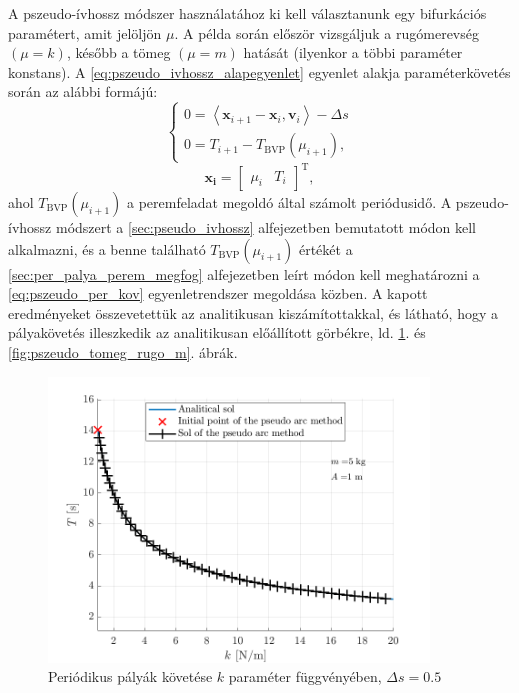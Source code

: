 A pszeudo-ívhossz módszer használatához ki kell választanunk egy bi\-fur\-ká\-ci\-ós paramétert, amit jelöljön $\mu$.
A példa során először vizsgáljuk a rugómerevség $(\mu = k)$, később a tömeg $(\mu =m)$ hatását (ilyenkor a többi paraméter konstans).
A \eqref{eq:pszeudo_ivhossz_alapegyenlet} egyenlet alakja paraméterkövetés során az alábbi formájú:
\begin{equation}
\begin{cases}
0 = \left< \mathbf{x}_{i+1} - \mathbf{x}_i, \mathbf{v}_i \right> - \Delta s \\
0 = T_{i+1} - T_{\mathrm{BVP}}(\mu_{i+1}),
\end{cases}
\label{eq:pszeudo_per_kov}
\end{equation}
\begin{equation}
\mathbf{x_i}= \begin{bmatrix}
\mu_{i} & T_{i}
\end{bmatrix}^\mathrm{T},
\end{equation}
ahol $T_{\mathrm{BVP}}(\mu_{i+1})$ a peremfeladat megoldó által számolt periódusidő.
A psze\-u\-do-ív\-hossz módszert a \ref{sec:pseudo_ivhossz} alfejezetben bemutatott módon kell alkalmazni, és a benne található $T_{\mathrm{BVP}}(\mu_{i+1})$ értékét a \ref{sec:per_palya_perem_megfog} alfejezetben leírt módon kell meghatározni a \eqref{eq:pszeudo_per_kov} egyenletrendszer megoldása közben.
A kapott eredményeket összevetettük az analitikusan kiszámítottakkal, és látható, hogy a pályakövetés illeszkedik az analitikusan előállított görbékre, ld. \ref{fig:pszeudo_tomeg_rugo_k}. és \ref{fig:pszeudo_tomeg_rugo_m}. ábrák.

\begin{figure}[ht]
	\centering
	\includegraphics[width=0.9\textwidth]{graphics/pszeudo_tomeg_rugo_k}
	\caption{Periódikus pályák követése $k$ paraméter függvényében, $\Delta s = 0.5$}\label{fig:pszeudo_tomeg_rugo_k}
\end{figure}

